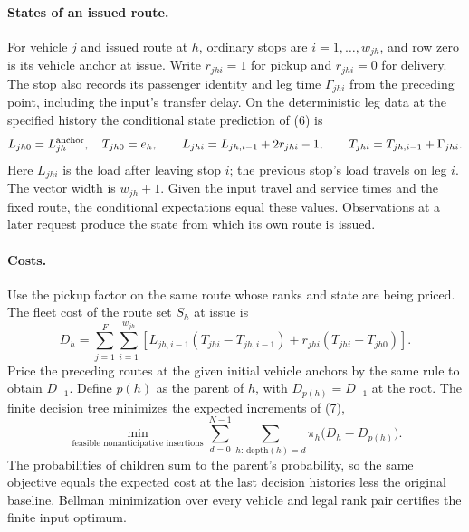 \documentclass{article}
\begin{document}
\paragraph{States of an issued route.}
For vehicle $j$ and issued route at $h$, ordinary stops are
$i=1,\ldots,w_{jh}$, and row zero is its vehicle anchor at issue. Write
$r_{jhi}=1$ for pickup and $r_{jhi}=0$ for delivery. The stop also records
its passenger identity and leg time $\Gamma_{jhi}$ from the preceding
point, including the input's transfer delay. On the deterministic leg data
at the specified history the conditional state prediction of (6) is
\[
 L_{jh0}=L^{\rm anchor}_{jh},\quad T_{jh0}=e_h,\qquad
 L_{jhi}=L_{jh,i-1}+2r_{jhi}-1,\qquad
 T_{jhi}=T_{jh,i-1}+\Gamma_{jhi}.
\]
Here $L_{jhi}$ is the load after leaving stop $i$; the previous stop's load
travels on leg $i$. The vector width is $w_{jh}+1$. Given the input travel
and service times and the fixed route, the conditional expectations equal
these values. Observations at a later request produce the state from which
its own route is issued.

\paragraph{Costs.}
Use the pickup factor on the same route whose ranks and state are being
priced. The fleet cost of the route set $S_h$ at issue is
\[
 D_h=\sum_{j=1}^{F}\sum_{i=1}^{w_{jh}}
 \left[L_{jh,i-1}\left(T_{jhi}-T_{jh,i-1}\right)
       +r_{jhi}\left(T_{jhi}-T_{jh0}\right)\right].
\]
Price the preceding routes at the given initial vehicle anchors by the
same rule to obtain $D_{-1}$. Define $p(h)$ as the parent of $h$,
with $D_{p(h)}=D_{-1}$ at the root. The finite decision tree minimizes
the expected increments of (7),
\[
 \min_{\text{feasible nonanticipative insertions}}
       \sum_{d=0}^{N-1}\sum_{h:\,\mathrm{depth}(h)=d}\pi_h\big(D_h-D_{p(h)}\big).
\]
The probabilities of children sum to the parent's probability, so the same
objective equals the expected cost at the last decision histories less
the original baseline. Bellman minimization over every vehicle and legal
rank pair certifies the finite input optimum.
\end{document}
